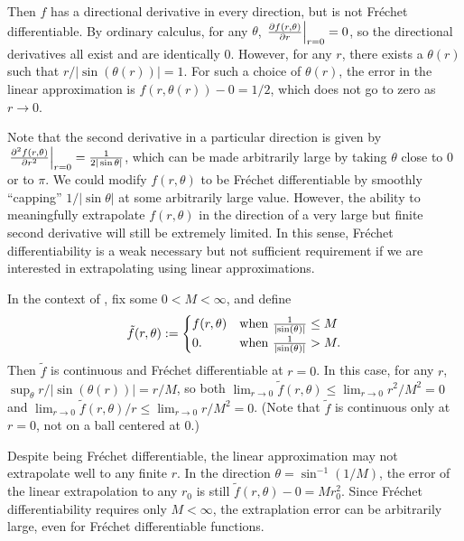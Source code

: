 \begin{ex}
Then $f$ has a directional derivative in every direction, but is not Fr{\'e}chet
differentiable.  By ordinary calculus, for any $\theta$, $\left.\frac{\partial f(r,
\theta)}{\partial r}\right\vert_{r=0} = 0$, so the directional derivatives all exist and are
identically $0$.  However, for any $r$, there exists a $\theta(r)$ such that $r /
|\sin(\theta(r))| = 1$.  For such a choice of $\theta(r)$, the error in the
linear approximation is $f(r, \theta(r)) - 0 = 1/2$, which does not go to zero
as $r \rightarrow 0$.

\end{ex}

Note that the second derivative in a particular direction is given by
$\left.\frac{\partial^2 f(r, \theta)}{\partial r^2}\right\vert_{r=0} = \frac{1}{2 |\sin
\theta|}$, which can be made arbitrarily large by taking $\theta$ close to $0$
or to $\pi$.  We could modify $f(r, \theta)$ to be Fr{\'e}chet differentiable
by smoothly ``capping'' $1 / |\sin \theta|$ at some arbitrarily large value.
However, the ability to meaningfully extrapolate $f(r, \theta)$ in the direction
of a very large but finite second derivative will still be extremely limited. In
this sense, Fr{\'e}chet differentiability is a weak necessary but not sufficient
requirement if we are interested in extrapolating using linear approximations.



\begin{ex}
%
In the context of , fix some $0 < M < \infty$,
and define
%
\begin{align*}
%
\tilde{f}(r, \theta) := \begin{cases}
    f(r, \theta) & \textrm{when }\frac{1}{\abs{\sin(\theta)}} \le M \\
    0. & \textrm{when }\frac{1}{\abs{\sin(\theta)}} > M.
%
\end{cases}
%
\end{align*}
%
Then $\tilde{f}$ is continuous and Fr{\'e}chet differentiable at $r=0$. In this
case, for any $r$, $\sup_{\theta} r / |\sin(\theta(r))| = r / M$, so  both
$\lim_{r \rightarrow 0} \tilde{f}(r, \theta) \le \lim_{r \rightarrow 0} r^2 /
M^2 = 0$ and $\lim_{r \rightarrow 0} \tilde{f}(r, \theta) / r \le \lim_{r
\rightarrow 0}  r / M^2 = 0$.  (Note that $\tilde{f}$ is continuous only
at $r=0$, not on a ball centered at $0$.)

Despite being Fr{\'e}chet differentiable, the linear approximation may not
extrapolate well to any finite $r$.  In the direction $\theta = \sin^{-1}(1 /
M)$, the error of the linear extrapolation to any $r_0$ is still $\tilde{f}(r,
\theta) - 0 = M r_0^2$. Since Fr{\'e}chet differentiability requires only $M <
\infty$, the extraplation error can be arbitrarily large, even for Fr{\'e}chet
differentiable functions.

\end{ex}



